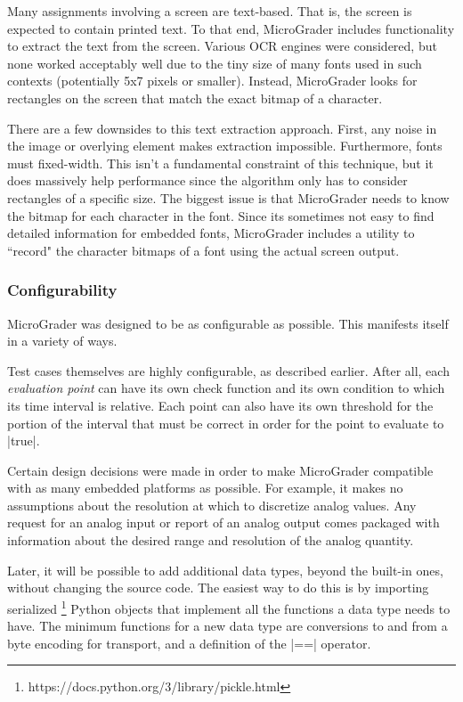 \documentclass[12pt]{article}
\begin{document}
Many assignments involving a screen are text-based.  That is, the screen is expected to contain printed text.  To that end, MicroGrader includes functionality to extract the text from the screen.  Various OCR engines were considered, but none worked acceptably well due to the tiny size of many fonts used in such contexts (potentially 5x7 pixels or smaller).  Instead, MicroGrader looks for rectangles on the screen that match the exact bitmap of a character.

There are a few downsides to this text extraction approach.  First, any noise in the image or overlying element makes extraction impossible.  Furthermore, fonts must fixed-width.  This isn't a fundamental constraint of this technique, but it does massively help performance since the algorithm only has to consider rectangles of a specific size.  The biggest issue is that MicroGrader needs to know the bitmap for each character in the font.  Since its sometimes not easy to find detailed information for embedded fonts, MicroGrader includes a utility to ``record" the character bitmaps of a font using the actual screen output.

\subsubsection{Configurability}
MicroGrader was designed to be as configurable as possible.  This manifests itself in a variety of ways.

Test cases themselves are highly configurable, as described earlier.  After all, each \textit{evaluation point} can have its own check function and its own condition to which its time interval is relative.  Each point can also have its own threshold for the portion of the interval that must be correct in order for the point to evaluate to |true|.

Certain design decisions were made in order to make MicroGrader compatible with as many embedded platforms as possible.  For example, it makes no assumptions about the resolution at which to discretize analog values.  Any request for an analog input or report of an analog output comes packaged with information about the desired range and resolution of the analog quantity.

Later, it will be possible to add additional data types, beyond the built-in ones, without changing the source code.  The easiest way to do this is by importing serialized \footnote{https://docs.python.org/3/library/pickle.html} Python objects that implement all the functions a data type needs to have.  The minimum functions for a new data type are conversions to and from a byte encoding for transport, and a definition of the |==| operator.
\end{document}
